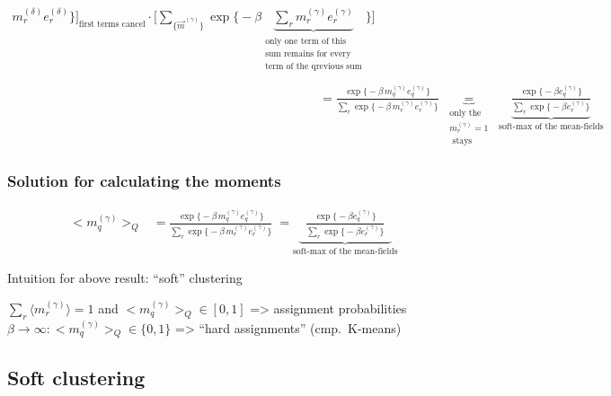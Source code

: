 \begin{frame}
\begin{equation}
\begin{array}{ll}
{{			m_{r}^{(\delta)}e_{r}^{(\delta)} \Big\} \Bigg]
			}_{ \text{first terms cancel} } 
			\cdot \Bigg[ \sum\limits_{ \big\{ \vec{m}^{(\gamma)} 
			\big\} } \exp \Big\{ -\beta
			\underbrace{ \sum\limits_{r} m_{r}^{(\gamma)}
				e_{r}^{(\gamma)} }_{
				\substack{	\text{only one term of this} \\
						\text{sum remains for every} \\
						\text{term of the qrevious }
						\text{sum}} }
				\Big\} \Bigg] } \\\\
	 & = \frac{ \exp \big\{ -\beta\, m_q^{(\gamma)} e_q^{(\gamma)} \big\} }{
	 	\sum\limits_{r} \exp \big\{ -\beta \,
	 	m_{r}^{(\gamma)} e_{r}^{(\gamma)} \big\} }
	\; \underbrace{=}_{\substack{\text{only the } \\ m_r^{(\gamma)} = 1 \\\text{ stays}}} \; \underbrace{\frac{ \exp \big\{ -\beta e_q^{(\gamma)} \big\} }{
		\sum\limits_{r} \exp \big\{ -\beta 
		e_{r}^{(\gamma)} \big\} }}_{\text{soft-max of the mean-fields}}
	\end{array}
\end{equation}
\end{frame}

\begin{frame}
\frametitle{Solution for calculating the moments}
$$
		\begin{array}{lll}
	\big< m_q^{(\gamma)} \big>_Q
	& = \frac{ \exp \big\{ -\beta\, m_q^{(\gamma)} e_q^{(\gamma)} \big\} }{
	 	\sum\limits_{r} \exp \big\{ -\beta \,
	 	m_{r}^{(\gamma)} e_{r}^{(\gamma)} \big\} }
	\; = \underbrace{\;\; \frac{ \exp \big\{ -\beta e_q^{(\gamma)} \big\} }{
		\sum\limits_{r} \exp \big\{ -\beta 
		e_{r}^{(\gamma)} \big\} }\;\;}_{\text{soft-max of the mean-fields}}
	\end{array}
$$
\begin{block}{Intuition for above result: ``soft'' clustering}
\begin{itemize}
\itr $\sum_r \langle m_r^{(\gamma)} \rangle = 1$  and $\big< m_q^{(\gamma)} \big>_Q \in [0, 1]$ => assignment probabilities
\itr $\beta \rightarrow \infty: \big< m_q^{(\gamma)} \big>_Q \in \{0, 1\} $ => ``hard assignments'' (cmp.\ K-means)
\end{itemize} 
\end{block}
\end{frame}

\subsection{Soft clustering}

